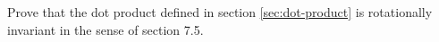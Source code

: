 Prove that the dot product defined in section \ref{sec:dot-product} is
rotationally invariant in the sense of section 7.5.
